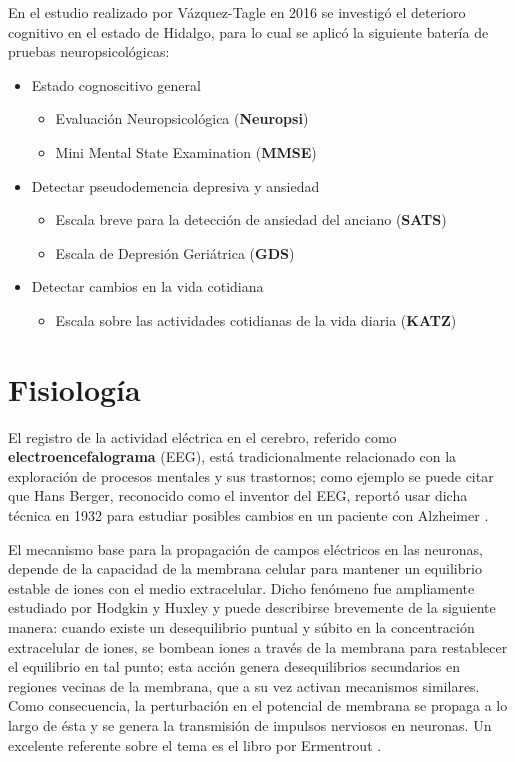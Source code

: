 En el estudio realizado por Vázquez-Tagle en 2016 \cite{VazquezTagle16} se investigó el deterioro
cognitivo en el estado de Hidalgo, para lo cual se aplicó la siguiente batería de pruebas
neuropsicológicas:
\begin{itemize}
\item Estado cognoscitivo general
\begin{itemize}
\item {Evaluación Neuropsicológica (\textbf{Neuropsi})} \cite{Solis03}
\item {Mini Mental State Examination (\textbf{MMSE})} \cite{Velasco15}
\end{itemize}
\item Detectar pseudodemencia depresiva y ansiedad
\begin{itemize}
\item {Escala breve para la detección de ansiedad del anciano (\textbf{SATS})} \cite{Vargas11}
\item {Escala de Depresión Geriátrica (\textbf{GDS})} \cite{Yesavage82,Greenberg12}
\end{itemize}
\item Detectar cambios en la vida cotidiana
\begin{itemize}
\item {Escala sobre las actividades cotidianas de la vida diaria (\textbf{KATZ})} \cite{Roumec14}
\end{itemize}
\end{itemize}


\section{Fisiología}

El registro de la actividad eléctrica en el cerebro, referido como \textbf{electroencefalograma} 
(EEG), está tradicionalmente relacionado con la exploración de procesos mentales y sus trastornos; 
como ejemplo se puede citar que Hans Berger, reconocido como el inventor del EEG, reportó usar 
dicha técnica en 1932 para estudiar posibles cambios en un paciente con Alzheimer 
\cite{historia_eeg}.

El mecanismo base para la propagación de campos eléctricos en las neuronas, depende de la 
capacidad de la membrana celular para mantener un equilibrio estable de iones con el medio 
extracelular.
%
Dicho fenómeno fue ampliamente estudiado por Hodgkin y Huxley y puede describirse brevemente de la 
siguiente manera: cuando existe un desequilibrio puntual y súbito en la concentración extracelular 
de iones, se bombean iones a través de la membrana para restablecer el equilibrio en tal punto; 
esta acción genera desequilibrios secundarios en regiones vecinas de la membrana, que a su vez 
activan mecanismos similares. 
%
Como consecuencia, la perturbación en el potencial de membrana se propaga a lo largo de ésta y se 
genera la transmisión de impulsos nerviosos en neuronas.
%
Un excelente referente sobre el tema es el libro por Ermentrout \cite{Ermentrout10}.

